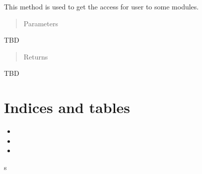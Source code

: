 \documentclass[letterpaper,10pt,english]{sphinxmanual}
\begin{document}
\begin{fulllineitems}
\begin{quote}
\begin{description}
\begin{itemize}
\end{itemize}

\end{description}\end{quote}

\begin{fulllineitems}
\label{\detokenize{index:src.ModuleManagement.ModuleManagement.get_access}}
This method is used to get the access for user
to some modules.
\begin{quote}\begin{description}
\item[{Parameters}] \leavevmode
\end{description}\end{quote}

TBD
\begin{quote}\begin{description}
\item[{Returns}] \leavevmode
\end{description}\end{quote}

TBD

\end{fulllineitems}


\end{fulllineitems}



\chapter{Indices and tables}
\label{\detokenize{index:indices-and-tables}}\label{\detokenize{index:welcome-to-coremanagement-s-documentation}}\begin{itemize}
\item {} 

\item {} 

\item {} 

\end{itemize}


\renewcommand{\indexname}{Python Module Index}
\begin{sphinxtheindex}
\def\bigletter#1{{\Large\sffamily#1}\nopagebreak\vspace{1mm}}
\bigletter{s}
\item {}
\end{sphinxtheindex}

\renewcommand{\indexname}{Index}
\printindex
\end{document}
